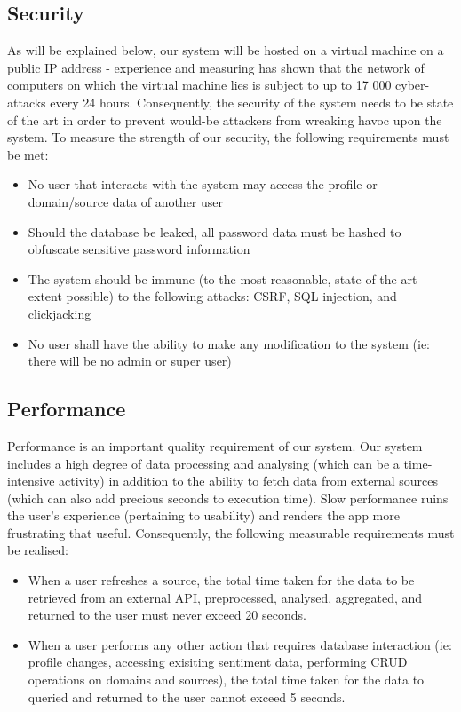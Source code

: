 \documentclass[12pt]{article}
\begin{document}
\subsection{Security}
As will be explained below, our system will be hosted on a virtual machine on a public IP address - experience and measuring has shown that the network of computers on which the virtual machine lies is subject to up to 17 000 cyber-attacks every 24 hours. Consequently, the security of the system needs to be state of the art in order to prevent would-be attackers from wreaking havoc upon the system. To measure the strength of our security, the following requirements must be met:
\begin{itemize}
    \item No user that interacts with the system may access the profile or domain/source data of another user
    \item Should the database be leaked, all password data must be hashed to obfuscate sensitive password information
    \item The system should be immune (to the most reasonable, state-of-the-art extent possible) to the following attacks: CSRF, SQL injection, and clickjacking
    \item No user shall have the ability to make any modification to the system (ie: there will be no admin or super user)
\end{itemize}
\subsection{Performance}
Performance is an important quality requirement of our system. Our system includes a high degree of data processing and analysing (which can be a time-intensive activity) in addition to the ability to fetch data from external sources (which can also add precious seconds to execution time). Slow performance ruins the user's experience (pertaining to usability) and renders the app more frustrating that useful. Consequently, the following measurable requirements must be realised:
\begin{itemize}
    \item When a user refreshes a source, the total time taken for the data to be retrieved from an external API, preprocessed, analysed, aggregated, and returned to the user must never exceed 20 seconds.
    \item When a user performs any other action that requires database interaction (ie: profile changes, accessing exisiting sentiment data, performing CRUD operations on domains and sources), the total time taken for the data to queried and returned to the user cannot exceed 5 seconds.
\end{itemize}
\end{document}
